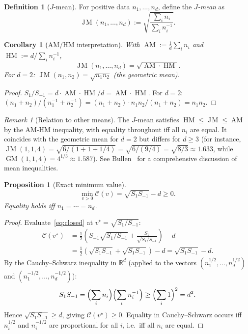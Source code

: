 \documentclass[11pt]{amsart}
\newtheorem{proposition}[theorem]{Proposition}
\newtheorem{corollary}[theorem]{Corollary}
\theoremstyle{definition}
\newtheorem{definition}[theorem]{Definition}
\theoremstyle{remark}
\newtheorem{remark}[theorem]{Remark}
\newcommand{\R}{\mathbb{R}}
\DeclareMathOperator{\JM}{J\!M}
\begin{document}
\begin{definition}[$J$-mean]\label{def:jmean}
For positive data $n_1,\dots,n_d$, define the \emph{$J$-mean} as
\[
\JM(n_1,\dots,n_d):=\sqrt{\frac{\sum_i n_i}{\sum_i n_i^{-1}}}.
\]
\end{definition}

\begin{corollary}[AM/HM interpretation]\label{cor:means}
With $\operatorname{AM}:=\frac1d\sum_i n_i$ and
$\operatorname{HM}:=d/\sum_i n_i^{-1}$,
\[
\JM(n_1,\dots,n_d)=\sqrt{\operatorname{AM}\cdot\operatorname{HM}}.
\]
For $d=2$: $\JM(n_1,n_2)=\sqrt{n_1n_2}$ (the geometric mean).
\end{corollary}
\begin{proof}
$S_1/S_{-1}=d\cdot\operatorname{AM}\cdot\operatorname{HM}/d
=\operatorname{AM}\cdot\operatorname{HM}$.
For $d=2$:
$(n_1+n_2)/(n_1^{-1}+n_2^{-1})
=(n_1+n_2)\cdot n_1n_2/(n_1+n_2)=n_1n_2$.
\end{proof}

\begin{remark}[Relation to other means]
The $J$-mean satisfies $\operatorname{HM}\le\JM\le\operatorname{AM}$
by the AM-HM inequality, with equality throughout iff all $n_i$ are equal.
It coincides with the geometric mean for $d=2$ but differs for $d\ge3$
(for instance, $\JM(1,1,4)=\sqrt{6/(1+1+1/4)}=\sqrt{6/(9/4)}
=\sqrt{8/3}\approx1.633$, while $\operatorname{GM}(1,1,4)=4^{1/3}\approx1.587$).
See Bullen~\cite{Bullen} for a comprehensive discussion of mean inequalities.
\end{remark}

\begin{proposition}[Exact minimum value]\label{prop:min-value}
\[
\min_{v>0}\mathcal C(v)=\sqrt{S_1 S_{-1}}-d\ge0.
\]
Equality holds iff $n_1=\cdots=n_d$.
\end{proposition}
\begin{proof}
Evaluate~\eqref{eq:closed} at $v^\star=\sqrt{S_1/S_{-1}}$:
\begin{align*}
\mathcal C(v^\star)
&=\frac12\!\left(S_{-1}\sqrt{S_1/S_{-1}}
  +\frac{S_1}{\sqrt{S_1/S_{-1}}}\right)-d \\
&=\frac12(\sqrt{S_1 S_{-1}}+\sqrt{S_1 S_{-1}})-d
=\sqrt{S_1 S_{-1}}-d.
\end{align*}
By the Cauchy--Schwarz inequality in $\R^d$
(applied to the vectors $(n_1^{1/2},\dots,n_d^{1/2})$ and
$(n_1^{-1/2},\dots,n_d^{-1/2})$):
\[
S_1 S_{-1}
=\Bigl(\sum_i n_i\Bigr)\Bigl(\sum_i n_i^{-1}\Bigr)
\ge\Bigl(\sum_i 1\Bigr)^2=d^2.
\]
Hence $\sqrt{S_1 S_{-1}}\ge d$, giving $\mathcal C(v^\star)\ge0$.
Equality in Cauchy--Schwarz occurs iff $n_i^{1/2}$ and $n_i^{-1/2}$
are proportional for all $i$, i.e.\ iff all $n_i$ are equal.
\end{proof}
\end{document}

